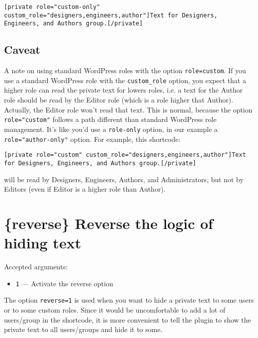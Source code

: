 \begin{lstlisting}
[private role="custom-only" custom_role="designers,engineers,author"]Text for Designers, Engineers, and Authors group.[/private]
\end{lstlisting}

\subsection{Caveat}\label{caveat}

A note on using standard WordPress  roles with the option \verb+role=custom+. If you use a
standard WordPress role with the \verb+custom_role+ option, you expect that a
higher role can read the private text for lowers roles, i.e. a text for the
Author role should be read by the Editor role (which is a role higher that
Author). Actually, the Editor role won't read that text. This is normal, because
the option \verb+role="custom"+ follows a path different than standard WordPress
role management. It's like you'd use a \verb+role-only+ option, in our example a
\verb+role="author-only"+ option. For example, this shortcode:

\begin{lstlisting}
[private role="custom" custom_role="designers,engineers,author"]Text for Designers, Engineers, and Authors group.[/private]
\end{lstlisting}

\noindent will be read by Designers, Engineers, Authors, and Administrators, but
not by Editors (even if Editor is a higher role than Author).

\section{\{reverse\} Reverse the logic of hiding text}

Accepted arguments:

\begin{itemize}
 \item \verb+1+ --- Activate the reverse option
\end{itemize}

The option \verb+reverse=1+ is used when you want to hide a private text to some
users or to some custom roles. Since it would be uncomfortable to add a lot of
users/group in the shortcode, it is more convenient to tell the plugin to show
the private text to all users/groups and hide it to some.

